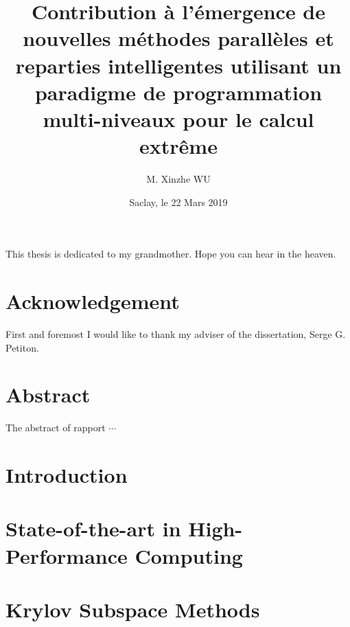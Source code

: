 \documentclass{xinzhewu}
\title{\large \textrm{Contribution \`a l’\'emergence de nouvelles m\'ethodes parall\`eles et reparties intelligentes utilisant un paradigme de programmation multi-niveaux pour le calcul extr\^eme}}
\author{M. Xinzhe WU}
\date{Saclay, le 22 Mars 2019}
\newenvironment{dedication}
{\clearpage           %
	\thispagestyle{empty}%
	\vspace*{\stretch{1}}%
	\itshape             %
	\raggedleft          %
}
{\par %
	\vspace{\stretch{3}} %
	\clearpage           %
}
\begin{document}
\maketitle
 
\clearemptydoublepage
\begin{dedication}
	This thesis is dedicated to my grandmother. Hope you can hear in the heaven.
\end{dedication}

\clearemptydoublepage

\chapter*{Acknowledgement}
\thispagestyle{empty}
First and foremost I would like to thank my adviser of the dissertation, Serge G. Petiton.

\clearemptydoublepage
\chapter*{Abstract}
\thispagestyle{empty}
The abstract of rapport $\cdots$

\clearemptydoublepage


\clearemptydoublepage

\frontmatter

{\small \tableofcontents}

{\small
\listoffigures
{}
}

{\small
\listoftables
{}
}

\mainmatter %

\chapter{Introduction}



\chapter{State-of-the-art in High-Performance Computing} \label{State-of-the-art in High-Performance Computing}



\chapter{Krylov Subspace Methods}\label{Krylov Subspace Methods}
\end{document}
